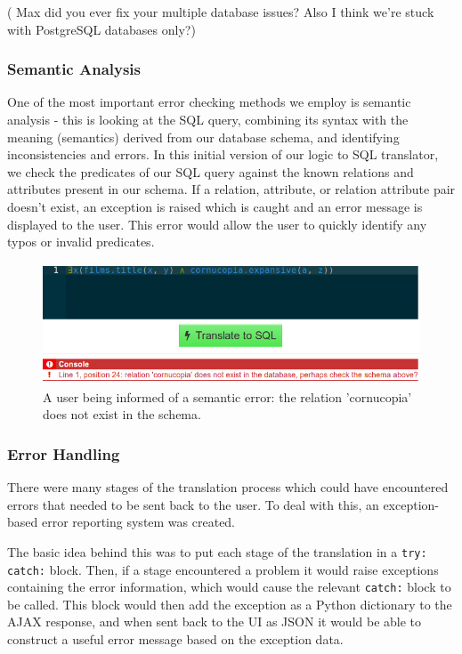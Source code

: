 \documentclass[a4paper, 11pt]{article}
\begin{document}
      ( Max did you ever fix your multiple database issues? Also I
      think we're stuck with PostgreSQL databases only?)

    \subsubsection{Semantic Analysis}
      One of the most important error checking methods we employ is semantic
      analysis - this is looking at the SQL query, combining its syntax with the
      meaning (semantics) derived from our database schema, and identifying
      inconsistencies and errors. In this initial version of our logic to SQL
      translator, we check the predicates of our SQL query against the known
      relations and attributes present in our schema. If a relation, attribute,
      or relation attribute pair doesn't exist, an exception is raised which is
      caught and an error message is displayed to the user. This error would
      allow the user to quickly identify any typos or invalid predicates.

      \begin{figure}[h!]
        \centering
        \includegraphics[width=1.0\textwidth]{images/error.png}
        \caption{A user being informed of a semantic error: the relation
          'cornucopia' does not exist in the schema.}
      \end{figure}

    \subsubsection{Error Handling}
      There were many stages of the translation process which could have
      encountered errors that needed to be sent back to the user. To deal with
      this, an exception-based error reporting system was created.

      The basic idea behind this was to put each stage of the translation in a
      \texttt{try: catch:} block. Then, if a stage encountered a problem it
      would raise exceptions containing the error information, which would cause
      the relevant \texttt{catch:} block to be called. This block would then add
      the exception as a Python dictionary to the AJAX response, and when sent
      back to the UI as JSON it would be able to construct a useful error
      message based on the exception data.
\end{document}
